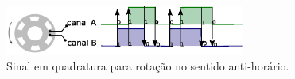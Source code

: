 \begin{figure}[H]
    \centering
    \includegraphics[width=0.7\textwidth]{figuras/ilustracoes/sinal_enquadratura_sentido_CCW.eps}
    \caption{Sinal em quadratura para rotação no sentido anti-horário.}
    \label{fig:ccw_signal}
\end{figure}

